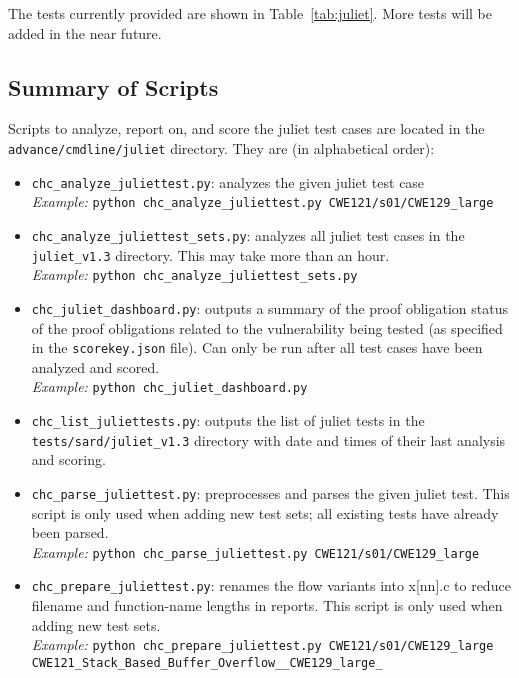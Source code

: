 \documentclass[11pt]{article}
\begin{document}
The tests currently provided are shown in Table~\ref{tab:juliet}. More tests will be
added in the near future.

\subsection{Summary of Scripts}

Scripts to analyze, report on, and score the juliet test cases are located in the
{\tt advance/cmdline/juliet} directory. They are (in alphabetical order):

\begin{itemize}[leftmargin=*]
\item {\tt chc\_analyze\_juliettest.py}: analyzes the given juliet test case \\
\emph{Example:} {\tt python chc\_analyze\_juliettest.py CWE121/s01/CWE129\_large}
\item {\tt chc\_analyze\_juliettest\_sets.py}: analyzes all juliet test cases in the
   {\tt juliet\_v1.3} directory. This may take more than an hour.\\
\emph{Example:} {\tt python chc\_analyze\_juliettest\_sets.py}
\item {\tt chc\_juliet\_dashboard.py}: outputs a summary of the proof obligation status
   of the proof obligations related to the vulnerability being tested (as specified
   in the {\tt scorekey.json} file). Can only be run after all test cases have been
   analyzed and scored. \\
\emph{Example:} {\tt python chc\_juliet\_dashboard.py}
\item {\tt chc\_list\_juliettests.py}: outputs the list of juliet tests in the
  {\tt tests/sard/juliet\_v1.3} directory with date and times of their last analysis
  and scoring.
\item {\tt chc\_parse\_juliettest.py}: preprocesses and parses the given juliet test.
 This script is only used when adding new test sets; all existing tests have already
 been parsed. \\
\emph{Example:} {\tt python chc\_parse\_juliettest.py CWE121/s01/CWE129\_large}
\item {\tt chc\_prepare\_juliettest.py}: renames the flow variants into x[nn].c to 
  reduce filename and function-name lengths in reports. This script is only used when
  adding new test sets.\\
\emph{Example:} {\tt python chc\_prepare\_juliettest.py CWE121/s01/CWE129\_large \\
   CWE121\_Stack\_Based\_Buffer\_Overflow\_\_CWE129\_large\_}

\end{itemize}
\end{document}
